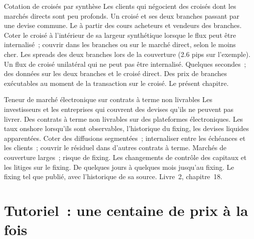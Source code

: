 \begin{strategyfile}{Cotation de croisés par synthèse}\label{strat:hf:fx-market-making:cross}
 Les clients qui négocient des croisés dont les marchés directs sont peu profonds.
 Un croisé et ses deux branches passant par une devise commune.
 Le  à partir des cours acheteurs et vendeurs des branches.
 Coter le croisé à l'intérieur de sa largeur synthétique lorsque le flux peut être internalisé~; couvrir dans les branches ou sur le marché direct,
selon le moins cher.
 Les spreads des deux branches lors de la couverture (2.6 pips sur l'exemple).
 Un flux de croisé unilatéral qui ne peut pas être internalisé.
 Quelques secondes~; des données sur les deux branches et le croisé direct.
 Des prix de branches exécutables au moment de la transaction sur le croisé.
 Le présent chapitre.
\end{strategyfile}

\begin{strategyfile}{Teneur de marché électronique sur contrats à terme non livrables}\label{strat:hf:fx-market-making:ndf}
 Les investisseurs et les entreprises qui couvrent des devises qu'ils ne peuvent pas livrer.
 Des contrats à terme non livrables sur des plateformes électroniques.
 Les taux onshore lorsqu'ils sont observables, l'historique du fixing, les devises liquides apparentées.
 Coter des diffusions segmentées~; internaliser entre les échéances et les clients~; couvrir le résiduel dans d'autres contrats à terme.
 Marchés de couverture larges~; risque de fixing.
 Les changements de contrôle des capitaux et les litiges sur le fixing.
 De quelques jours à quelques mois jusqu'au fixing.
 Le fixing tel que publié, avec l'historique de sa source.
 Livre~2, chapitre~18.
\end{strategyfile}

\section{Tutoriel~: une centaine de prix à la fois}\label{tut:hf:fx-market-making:tut}

